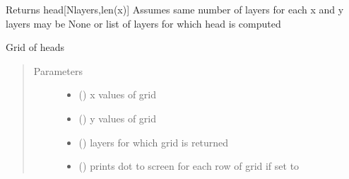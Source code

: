 \documentclass[letterpaper,10pt,english]{sphinxmanual}
\begin{document}
\begin{fulllineitems}
\begin{fulllineitems}
\begin{quote}
\begin{description}
\end{description}\end{quote}

\end{fulllineitems}


\begin{fulllineitems}
\label{\detokenize{models/modelmaq:timml.model.ModelMaq.headalongline}}
Returns head{[}Nlayers,len(x){]}
Assumes same number of layers for each x and y
layers may be None or list of layers for which head is computed

\end{fulllineitems}


\begin{fulllineitems}
\label{\detokenize{models/modelmaq:timml.model.ModelMaq.headgrid}}
Grid of heads
\begin{quote}\begin{description}
\item[{Parameters}] \leavevmode\begin{itemize}
\item {} 
 () \textendash{} x values of grid

\item {} 
 () \textendash{} y values of grid

\item {} 
 (\sphinxstyleliteralemphasis{, }\sphinxstyleliteralemphasis{, }) \textendash{} layers for which grid is returned

\item {} 
 (\sphinxstyleliteralemphasis{, }) \textendash{} prints dot to screen for each row of grid if set to 

\end{itemize}


\end{description}
\end{quote}
\end{fulllineitems}
\end{fulllineitems}
\end{document}
